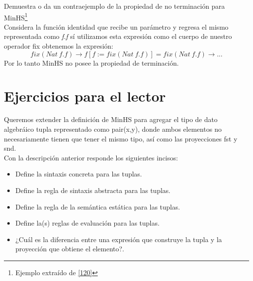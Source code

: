         \begin{exercise}
            Demuestra o da un contraejemplo de la propiedad de no terminación para \textsf{MinHS}\footnote{Ejemplo extraído de \hyperlink{120}{[120]}}\\

            Considera la función identidad que recibe un parámetro y regresa el mismo representada como \textit{f.f} sí utilizamos esta expresión como el cuerpo de nuestro operador \textsf{fix} obtenemos la expresión:
            \[
                \textit{fix}(Nat\ f.f) \to f[f:=fix(Nat\ f.f)] = fix(Nat\ f.f)  \to ...
            \]
            Por lo tanto \textsf{MinHS} no posee la propiedad de terminación.
        \end{exercise}


\section{Ejercicios para el lector}

    \begin{exercise}
        Queremos extender la definición de \textsf{MinHS} para agregar el tipo de dato algebráico tupla representado como \textsf{pair(x,y)}, donde ambos elementos no necesariamente tienen que tener el mismo tipo, así como las proyecciones \textsf{fst} y \textsf{snd}.\\

        Con  la descripción anterior responde los siguientes incisos:\\
        \begin{itemize}
            \item Define la sintaxis concreta para las tuplas.
            \item Define la regla de sintaxis abstracta para las tuplas.
            \item Define la regla de la semántica estática para las tuplas.
            \item Define la(s) reglas de evaluación para las tuplas.
            \item ¿Cuál es la diferencia entre una expresión que construye la tupla y la proyección que obtiene el elemento?.
        \end{itemize}
    \end{exercise}

\bigskip

